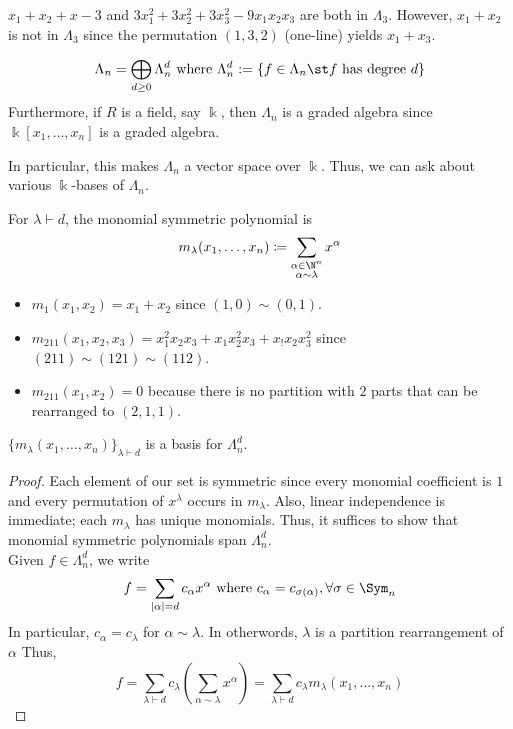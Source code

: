 \documentclass[11pt,leqno,oneside]{amsart}
\numberwithin{thm}{section}
\newcommand{\defeq}{\coloneqq}
\newcommand{\partitionof}{\vdash}
\newcommand{\sym}{\Lambda}
\renewcommand{\k}{\Bbbk}
\begin{document}
\begin{example}
  \(x_1+x_2+x-3\) and \(3x_1^2+3x_2^2+3x_3^2-9x_1x_2x_3\) are both in
  \(\sym_3\). However, \(x_1+x_2\) is not in \(\sym_3\) since the
  permutation \((1,3,2)\) (one-line) yields \(x_1+x_3\).
\end{example}
\begin{cor}
  \[
    \sym_n = \bigoplus_{d \geq 0} \sym_n^d \text{ where } \sym_n^d :=
    \{f \in \sym_n \st f \text{ has degree }d\}
  \]
  Furthermore, if \(R\) is a field, say \(\k\), then \(\sym_n\) is a
  graded algebra since \(\k[x_1, \ldots, x_n]\) is a graded algebra.
\end{cor}
\begin{rmk}
  In particular, this makes \(\sym_n\) a vector space over
  \(\k\). Thus, we can ask about various \(\k\)-bases of \(\sym_n\).
\end{rmk}
\begin{defn}
  For \(\lambda \partitionof d\), the monomial symmetric polynomial
  is \[
    m_\lambda(x_1, \ldots, x_n) \defeq \sum_{\substack{\alpha \in \N^n
      \\ \alpha \sim \lambda}} x^\alpha
  \]
\end{defn}
\begin{example}
  \begin{itemize}
  \item   \(m_1(x_1, x_2) = x_1+x_2\) since \((1,0) \sim (0,1)\).
  \item \(m_{211}(x_1, x_2, x_3) = x_1^2 x_2 x_3 + x_1 x_2^2 x_3 + x_!
    x_2 x_3^2\) since \((211) \sim (121) \sim (112)\).
  \item \(m_{211}(x_1, x_2) = 0\) because there is no partition with
    \(2\) parts that can be rearranged to \((2,1,1)\).
  \end{itemize}
\end{example}
\begin{prop}
  \(\{m_\lambda(x_1, \ldots, x_n)\}_{\lambda \partitionof d}\) is a
  basis for \(\sym_n^d\).
\end{prop}
\begin{proof}
  Each element of our set is symmetric since every monomial
  coefficient is \(1\) and every permutation of \(x^\lambda\) occurs
  in \(m_\lambda\). Also, linear independence is immediate; each
  \(m_\lambda\) has unique monomials. Thus, it suffices to show that
  monomial symmetric polynomials span \(\sym_n^d\). \\

  Given \(f \in \sym_n^d\), we write \[
    f = \sum_{|\alpha|=d} c_\alpha x^\alpha \text{ where } c_\alpha =
    c_{\sigma(\alpha)}, \forall \sigma \in \Sym_n
  \]
  In particular, \(c_\alpha = c_\lambda\) for \(\alpha \sim
  \lambda\). In otherwords, \(\lambda\) is a partition rearrangement
  of \(\alpha\) Thus, \[
    f = \sum_{\lambda \partitionof d} c_\lambda \left( \sum_{\alpha
        \sim \lambda} x^\alpha \right) = \sum_{\lambda \partitionof d}
    c_\lambda m_\lambda(x_1, \ldots, x_n)
  \]
\end{proof}
\end{document}
